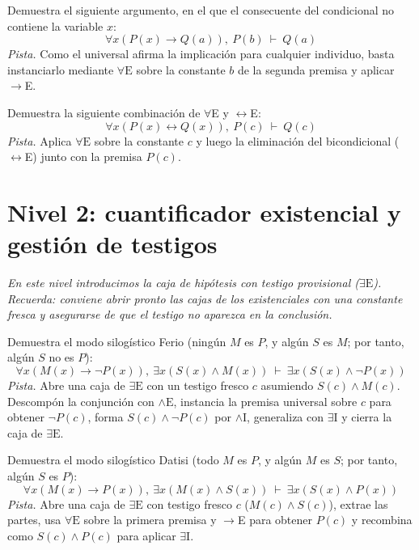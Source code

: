 \begin{pregunta}\label{e4-4}
Demuestra el siguiente argumento, en el que el consecuente del condicional no contiene la variable $x$:
\[
\forall x (P(x) \to Q(a)), \ P(b) \ \vdash \ Q(a)
\]
\textit{Pista.} Como el universal afirma la implicación para cualquier individuo, basta instanciarlo mediante $\forall\text{E}$ sobre la constante $b$ de la segunda premisa y aplicar $\to$E.
\end{pregunta}

\begin{pregunta}\label{e4-5}
Demuestra la siguiente combinación de $\forall$E y $\leftrightarrow$E:
\[
\forall x (P(x) \leftrightarrow Q(x)), \ P(c) \ \vdash \ Q(c)
\]
\textit{Pista.} Aplica $\forall\text{E}$ sobre la constante $c$ y luego la eliminación del bicondicional ($\leftrightarrow$E) junto con la premisa $P(c)$.
\end{pregunta}

\section*{Nivel 2: cuantificador existencial y gestión de testigos}
\textit{En este nivel introducimos la caja de hipótesis con testigo provisional ($\exists\text{E}$). Recuerda: conviene abrir pronto las cajas de los existenciales con una constante fresca y asegurarse de que el testigo no aparezca en la conclusión.}

\begin{pregunta}\label{e4-6}
Demuestra el modo silogístico Ferio (ningún $M$ es $P$, y algún $S$ es $M$; por tanto, algún $S$ no es $P$):
\[
\forall x (M(x) \to \neg P(x)), \ \exists x (S(x) \land M(x)) \ \vdash \ \exists x (S(x) \land \neg P(x))
\]
\textit{Pista.} Abre una caja de $\exists\text{E}$ con un testigo fresco $c$ asumiendo $S(c) \land M(c)$. Descompón la conjunción con $\land\text{E}$, instancia la premisa universal sobre $c$ para obtener $\neg P(c)$, forma $S(c) \land \neg P(c)$ por $\land\text{I}$, generaliza con $\exists\text{I}$ y cierra la caja de $\exists\text{E}$.
\end{pregunta}

\begin{pregunta}\label{e4-7}
Demuestra el modo silogístico Datisi (todo $M$ es $P$, y algún $M$ es $S$; por tanto, algún $S$ es $P$):
\[
\forall x (M(x) \to P(x)), \ \exists x (M(x) \land S(x)) \ \vdash \ \exists x (S(x) \land P(x))
\]
\textit{Pista.} Abre una caja de $\exists\text{E}$ con testigo fresco $c$ ($M(c) \land S(c)$), extrae las partes, usa $\forall\text{E}$ sobre la primera premisa y $\to$E para obtener $P(c)$ y recombina como $S(c) \land P(c)$ para aplicar $\exists\text{I}$.
\end{pregunta}


